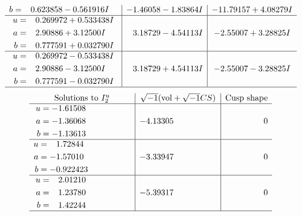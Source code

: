 \documentclass[1p]{elsarticle_modified}
\theoremstyle{definition}
\newcommand{\I}{\sqrt{-1}}
\begin{document}
$$\begin{array}{c|c|c}
\begin{aligned}
b &= \phantom{-}0.623858 - 0.561916 I\end{aligned}
 & -1.46058 - 1.83864 I & -11.79157 + 4.08279 I \\ \hline\begin{aligned}
u &= \phantom{-}0.269972 + 0.533438 I \\
a &= \phantom{-}2.90886 + 3.12500 I \\
b &= \phantom{-}0.777591 + 0.032790 I\end{aligned}
 & \phantom{-}3.18729 - 4.54113 I & -2.55007 + 3.28825 I \\ \hline\begin{aligned}
u &= \phantom{-}0.269972 - 0.533438 I \\
a &= \phantom{-}2.90886 - 3.12500 I \\
b &= \phantom{-}0.777591 - 0.032790 I\end{aligned}
 & \phantom{-}3.18729 + 4.54113 I & -2.55007 - 3.28825 I\\
 \hline 
 \end{array}$$\newpage$$\begin{array}{c|c|c}  
\text{Solutions to }I^u_{2}& \I (\text{vol} + \sqrt{-1}CS) & \text{Cusp shape}\\
 \hline 
\begin{aligned}
u &= -1.61508\phantom{ +0.000000I} \\
a &= -1.36068\phantom{ +0.000000I} \\
b &= -1.13613\phantom{ +0.000000I}\end{aligned}
 & -4.13305\phantom{ +0.000000I} & \phantom{-0.000000 } 0 \\ \hline\begin{aligned}
u &= \phantom{-}1.72844\phantom{ +0.000000I} \\
a &= -1.57010\phantom{ +0.000000I} \\
b &= -0.922423\phantom{ +0.000000I}\end{aligned}
 & -3.33947\phantom{ +0.000000I} & \phantom{-0.000000 } 0 \\ \hline\begin{aligned}
u &= \phantom{-}2.01210\phantom{ +0.000000I} \\
a &= \phantom{-}1.23780\phantom{ +0.000000I} \\
b &= \phantom{-}1.42244\phantom{ +0.000000I}\end{aligned}
 & -5.39317\phantom{ +0.000000I} & \phantom{-0.000000 } 0\\
 \hline 
 \end{array}$$\newpage\newpage\renewcommand{\arraystretch}{1}
\end{document}
